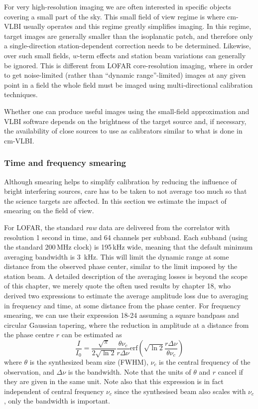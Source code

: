 \documentclass[graybox]{svmult}
\begin{document}
For very high-resolution imaging we are often interested in specific objects
covering a small part of the sky. This small field of view regime is where
cm-VLBI usually operates and this regime greatly simplifies imaging. In this
regime, target images are generally smaller than the isoplanatic patch, and
therefore only a single-direction station-dependent correction needs to be
determined.  Likewise, over such small fields, $w$-term effects and station
beam variations can generally be ignored.  This is different from LOFAR
core-resolution imaging, where in order to get noise-limited (rather than
``dynamic range''-limited) images at any given point in a field the whole field
must be imaged using multi-directional calibration techniques.

Whether one can produce useful images using the small-field approximation and
VLBI software depends on the brightness of the target source and, if necessary,
the availability of close sources to use as calibrators similar to what is done
in cm-VLBI.

\subsubsection{Time and frequency smearing}
\label{sect:smearing}
Although smearing helps to simplify calibration by reducing the influence of
bright interfering sources, care has to be taken to not average too much so
that the science targets are affected. In this section we estimate the impact
of smearing on the field of view.

For LOFAR, the standard
\emph{raw} data are delivered from the correlator with resolution 1 second in
time, and 64 channels per subband.  Each subband (using the standard 200\,MHz
clock) is 195\,kHz wide, meaning that the default minimum averaging bandwidth
is 3~kHz. This will limit the dynamic range at some distance from the observed
phase center, similar to the limit imposed by the station beam.  A detailed
description of the averaging losses is beyond the scope of this chapter, we
merely quote the often used results by \cite{taylor99} chapter 18, who derived
two expressions to estimate the average amplitude loss due to averaging in
frequency and time, at some distance from the phase center.  For frequency
smearing, we can use their expression 18-24 assuming a square bandpass and
circular Gaussian tapering, where the reduction in amplitude at a distance from
the phase centre $r$ can be estimated as
\begin{equation}
\frac{I}{I_0} = \frac{\sqrt{\pi}}{2\sqrt{\ln{2}}}\frac{\theta \nu_c}{r \Delta
\nu}\mathrm{erf}\left(\sqrt{\ln{2}}\frac{r \Delta\nu}{\theta \nu_c}\right)
\label{eqn:freqloss}
\end{equation}
where $\theta$ is the synthesized beam size (FWHM), $\nu_c$ is the central
frequency of the observation, and $\Delta \nu$ is the bandwidth. Note that the
units of $\theta$ and $r$ cancel if they are given in the same unit. Note also
that this expression is in fact independent of central frequency $\nu_c$ since
the synthesised beam also scales with $\nu_c$, only the bandwidth is important.
\end{document}
